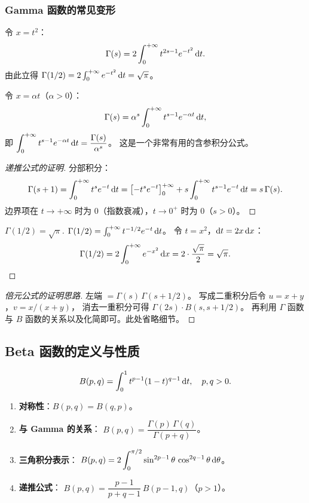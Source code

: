 \documentclass{ctexart}
\begin{document}
\subsubsection*{Gamma 函数的常见变形}

令 $x = t^2$：
\[
  \Gamma(s) = 2\int_0^{+\infty} t^{2s-1} e^{-t^2}\,\mathrm{d} t.
\]
由此立得 $\Gamma(1/2) = 2\int_0^{+\infty} e^{-t^2}\,\mathrm{d} t = \sqrt{\pi}$。

令 $x = \alpha t$（$\alpha > 0$）：
\[
  \Gamma(s) = \alpha^s \int_0^{+\infty} t^{s-1} e^{-\alpha t}\,\mathrm{d} t,
\]
即 $\displaystyle\int_0^{+\infty} t^{s-1} e^{-\alpha t}\,\mathrm{d} t = \frac{\Gamma(s)}{\alpha^s}$。
这是一个非常有用的含参积分公式。

\begin{proof}[递推公式的证明]
  分部积分：
  \[
    \Gamma(s+1) = \int_0^{+\infty} t^s e^{-t}\,\mathrm{d} t
    = \left[-t^s e^{-t}\right]_0^{+\infty} + s\int_0^{+\infty} t^{s-1}e^{-t}\,\mathrm{d} t
    = s\,\Gamma(s).
  \]
  边界项在 $t \to +\infty$ 时为 $0$（指数衰减），$t \to 0^+$ 时为 $0$（$s > 0$）。
\end{proof}

\begin{proof}[$\Gamma(1/2) = \sqrt{\pi}$]
  $\Gamma(1/2) = \int_0^{+\infty} t^{-1/2}e^{-t}\,\mathrm{d} t$。
  令 $t = x^2$，$\mathrm{d} t = 2x\,\mathrm{d} x$：
  \[
    \Gamma(1/2) = 2\int_0^{+\infty} e^{-x^2}\,\mathrm{d} x
    = 2 \cdot \frac{\sqrt{\pi}}{2} = \sqrt{\pi}.
  \]
\end{proof}

\begin{proof}[倍元公式的证明思路]
  左端 $= \Gamma(s)\,\Gamma(s+1/2)$。
  写成二重积分后令 $u = x+y$，$v = x/(x+y)$，
  消去一重积分可得 $\Gamma(2s) \cdot B(s, s+1/2)$。
  再利用 $\Gamma$ 函数与 $B$ 函数的关系以及化简即可。此处省略细节。
\end{proof}

\subsection{Beta 函数的定义与性质}

\begin{definition}[Beta 函数]
  \[
    B(p,q) = \int_0^1 t^{p-1}(1-t)^{q-1}\,\mathrm{d} t, \quad p, q > 0.
  \]
\end{definition}

\begin{theorem}
  \begin{enumerate}
    \item \textbf{对称性}：$B(p,q) = B(q,p)$。
    \item \textbf{与 Gamma 的关系}：
      $B(p,q) = \dfrac{\Gamma(p)\,\Gamma(q)}{\Gamma(p+q)}$。
    \item \textbf{三角积分表示}：
      $B(p,q) = 2\displaystyle\int_0^{\pi/2} \sin^{2p-1}\theta\,\cos^{2q-1}\theta \,\mathrm{d}\theta$。
    \item \textbf{递推公式}：
      $B(p,q) = \dfrac{p-1}{p+q-1}\,B(p-1,q)$（$p > 1$）。
  \end{enumerate}
\end{theorem}
\end{document}
